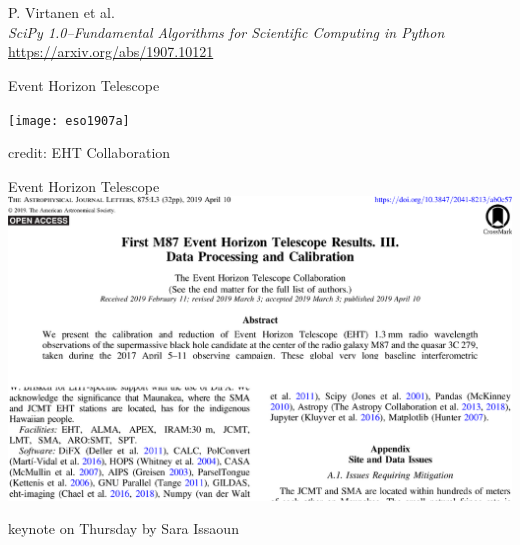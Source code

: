 \documentclass[svgnames]{beamer}
\begin{document}
\begin{frame}

 \vspace{3.5truecm}
 \begin{center}
  \\[0.4truecm]

  \vspace{2truecm}
  \faGithub\ 
 \end{center}
\end{frame}

\begin{frame}
 P. Virtanen et al.\\
 \textit{SciPy 1.0--Fundamental Algorithms for Scientific Computing in Python}\\
 \url{https://arxiv.org/abs/1907.10121}

\end{frame}

\begin{frame}{Event Horizon Telescope}

 \vspace{0.3truecm}
 \texttt{[image: eso1907a]}

 \vspace{-0.4truecm}
 \begin{flushright}
  \footnotesize credit: EHT Collaboration
 \end{flushright}
\end{frame}

\begin{frame}{Event Horizon Telescope}
 \includegraphics[width=\textwidth]{eht2019}

 \begin{center}
  \large {}\quad keynote on Thursday by Sara Issaoun
 \end{center}
\end{frame}
\end{document}
